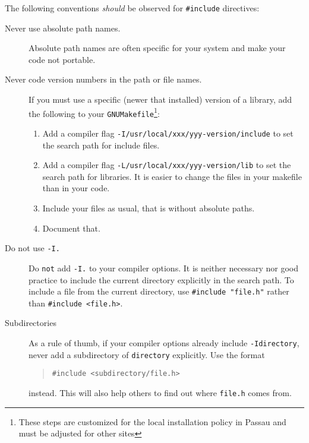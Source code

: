 The following conventions \emph{should} be observed for
\texttt{\#include} directives:

\begin{description}
  
  \item[Never use absolute path names.]  Absolute path
  names are often specific for your system and make your code
  not portable.
    
  \item[Never code version numbers in the path or file names.]  If you 
  must use a specific (newer that installed) version of a library, add 
  the following to your \texttt{GNUMakefile}\footnote{These steps are 
  customized for the local installation policy in Passau and must be 
  adjusted for other sites}:

  \begin{enumerate}
  
    \item Add a compiler flag
    \texttt{-I/usr/local/xxx/yyy-version/include} to set the search
    path for include files.

    \item Add a compiler flag
    \texttt{-L/usr/local/xxx/yyy-version/lib} to set the search path
    for libraries. It is easier to change the files in your
    makefile than in your code.
    
    \item Include your files as usual, that is without absolute
    paths.
    
    \item Document that.
  \end{enumerate}
   
 
  \item[Do not use \texttt{-I.}]
    Do \texttt{not} add \texttt{-I.} to your compiler
    options.  It is neither necessary nor good practice to
    include the current directory explicitly in the search
    path.  To include a file from the current directory, use
    \verb|#include "file.h"| rather than \verb|#include <file.h>|.
   
  \item[Subdirectories] As a rule of thumb, if your
  compiler options already include \texttt{-Idirectory}, never
  add a subdirectory of \texttt{directory} explicitly. Use the
  format
  
  \begin{quote}
    \verb|#include <subdirectory/file.h>|
  \end{quote}
  
  instead. This will also help others to find out where
  \texttt{file.h} comes from.

\end{description}



